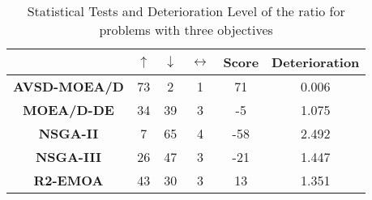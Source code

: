 \begin{table*}[t]
\caption{Statistical Tests and Deterioration Level of the \HV{} ratio for problems with three objectives}
\label{tab:Tests_HV_3obj}
\centering
\begin{tabular}{c|c|c|c|c|c|}
\cline{2-6}
 & \textbf{$\uparrow$} & \textbf{$\downarrow$} & \textbf{$\leftrightarrow$} & \textbf{Score} & \textbf{Deterioration} \\ \hline
\multicolumn{1}{|c|}{\textbf{AVSD-MOEA/D}} & 73 & 2 & 1 & 71 & 0.006 \\ \hline
\multicolumn{1}{|c|}{\textbf{MOEA/D-DE}} & 34 & 39 & 3 & -5 & 1.075 \\ \hline
\multicolumn{1}{|c|}{\textbf{NSGA-II}} & 7 & 65 & 4 & -58 & 2.492 \\ \hline
\multicolumn{1}{|c|}{\textbf{NSGA-III}} & 26 & 47 & 3 & -21 & 1.447 \\ \hline
\multicolumn{1}{|c|}{\textbf{R2-EMOA}} & 43 & 30 & 3 & 13 & 1.351 \\ \hline
\end{tabular}
\end{table*}




